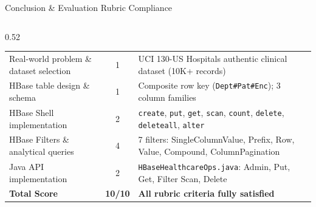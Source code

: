 \documentclass[aspectratio=169]{beamer}
\begin{document}
\begin{frame}[shrink=3]{Conclusion \& Evaluation Rubric Compliance}
\begin{columns}[T]
\begin{column}{0.52\textwidth}
{\begin{table}
\begin{tabular}{>{\raggedright\arraybackslash}p{2.8cm}cp{3.2cm}}
                    \midrule
                    Real-world problem \& dataset selection & 1 & UCI 130-US Hospitals authentic clinical dataset (10K+ records) \\
                    HBase table design \& schema & 1 & Composite row key (\texttt{Dept\#Pat\#Enc}); 3 column families \\
                    HBase Shell implementation & 2 & \texttt{create}, \texttt{put}, \texttt{get}, \texttt{scan}, \texttt{count}, \texttt{delete}, \texttt{deleteall}, \texttt{alter} \\
                    HBase Filters \& analytical queries & 4 & 7 filters: SingleColumnValue, Prefix, Row, Value, Compound, ColumnPagination \\
                    Java API implementation & 2 & \texttt{HBaseHealthcareOps.java}: Admin, Put, Get, Filter Scan, Delete \\
                    \midrule
                    \textbf{Total Score} & \textbf{10/10} & \textbf{All rubric criteria fully satisfied} \\
                    \bottomrule
                \end{tabular}
            \end{table}
            }
        \end{column}
    \end{columns}
\end{frame}
\end{document}
